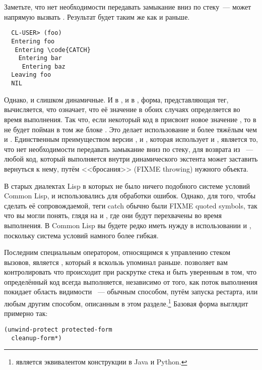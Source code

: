 Заметьте, что нет необходимости передавать замыкание вниз по стеку~---  может
напрямую вызвать .  Результат будет таким же как и раньше.

\begin{verbatim}
  CL-USER> (foo)
  Entering foo
   Entering \code{CATCH}
    Entering bar
     Entering baz
  Leaving foo
  NIL
\end{verbatim}

Однако,  и  слишком динамичные.  И в , и в
, форма, представляющая тег, вычисляется, что означает, что её значение в
обоих случаях определяется во время выполнения.  Так что, если некоторый код в 
присвоит новое значение , то  в  не будет пойман в том
же блоке .  Это делает использование  и  более тяжёлым
чем  и . Единственным преимуществом версии ,
 и , которая использует  и , является то, что
нет необходимости передавать замыкание вниз по стеку, для возврата из ~---
любой код, который выполняется внутри динамического экстента  может заставить
вернуться к нему, путём <<бросания>> (FIXME throwing) нужного объекта.

В старых диалектах Lisp в которых не было ничего подобного системе условий Common Lisp,
 и  использовались для обработки ошибок.  Однако, для того, чтобы
сделать её сопровождаемой, теги catch обычно были FIXME quoted symbols, так что вы могли
понять, глядя на  и , где они будут перехвачены во время
выполнения. В Common Lisp вы будете редко иметь нужду в использовании  и
, поскольку система условий намного более гибкая.

Последним специальным оператором, относящимся к управлению стеком вызовов, является
, который я вскользь упоминал раньше.  позволяет
вам контролировать что происходит при раскрутке стека и быть уверенным в том, что
определённый код всегда выполняется, независимо от того, как поток выполнения покидает
область видимости ~--- обычным способом, путём запуска рестарта, или
любым другим способом, описанным в этом разделе.\footnote{ является
  эквивалентом конструкции  в Java и Python.}  Базовая форма
 выглядит примерно так:

\begin{lstlisting}
(unwind-protect protected-form
  cleanup-form*)
\end{lstlisting}

